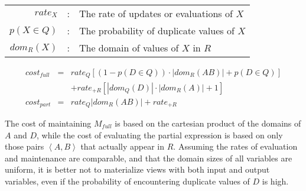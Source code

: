 \vspace*{0.07in}
{\small
\begin{tabular}{rcl}
$rate_X$ & : & The rate of updates or evaluations of $X$\\
$p(X \in Q)$ & : & The probability of duplicate values of $X$\\
$dom_R(X)$ & : & The domain of values of $X$ in $R$\\
\end{tabular}
\vspace*{-0.09in}
\begin{eqnarray*}
cost_{full} & = & rate_{Q} \left[(1-p(D \in Q))\cdot|dom_R(AB)|+p(D \in Q)\right] \\
 &  & + rate_{+R} \left[|dom_Q(D)|\cdot|dom_R(A)| + 1\right]\\
cost_{part} & = & rate_{Q} |dom_R(AB)| + rate_{+R}
\end{eqnarray*}
}
The cost of maintaining $M_{full}$ is based on the cartesian product of the domains of $A$ and $D$, while the cost of evaluating the partial expression is based on only those pairs $\left<A,B\right>$ that actually appear in $R$.  Assuming the rates of evaluation and maintenance are comparable, and that the domain sizes of all variables are uniform, it is better not to materialize views with both input and output variables, even if the probability of encountering duplicate values of $D$ is high.

